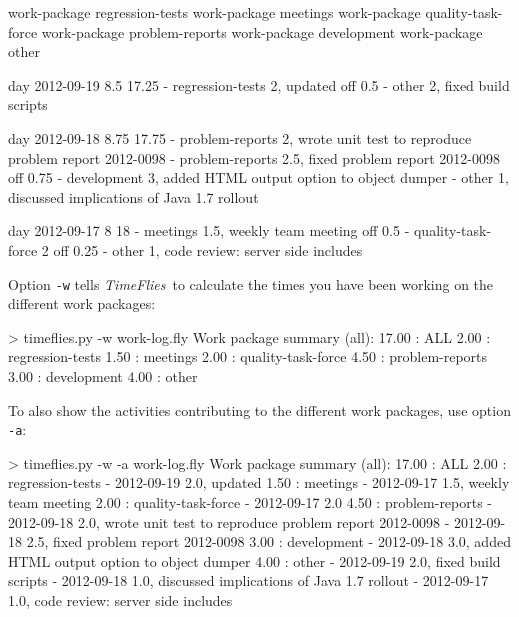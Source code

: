 \documentclass[11pt]{article}
\newcommand{\timeflies}{\emph{TimeFlies}}
\begin{document}
\begin{inputfile}
work-package regression-tests
work-package meetings
work-package quality-task-force
work-package problem-reports
work-package development
work-package other

day 2012-09-19 8.5 17.25
- regression-tests 2, updated
off 0.5
- other 2, fixed build scripts

day 2012-09-18 8.75 17.75
- problem-reports 2, wrote unit test to reproduce problem report 2012-0098
- problem-reports 2.5, fixed problem report 2012-0098
off 0.75
- development 3, added HTML output option to object dumper
- other 1, discussed implications of Java 1.7 rollout

day 2012-09-17 8 18
- meetings 1.5, weekly team meeting
off 0.5
- quality-task-force 2 
off 0.25
- other 1, code review: server side includes
\end{inputfile}

Option \verb:-w: tells \timeflies\ to calculate the times you have been working on the different work packages:

\begin{inputfile}
> timeflies.py -w work-log.fly 
Work package summary (all):
 17.00 : ALL
      2.00 : regression-tests
      1.50 : meetings
      2.00 : quality-task-force
      4.50 : problem-reports
      3.00 : development
      4.00 : other
\end{inputfile}

To also show the activities contributing to the different work packages, use option \verb:-a::

\begin{inputfile}
> timeflies.py -w -a work-log.fly 
Work package summary (all):
 17.00 : ALL
      2.00 : regression-tests
             - 2012-09-19 2.0, updated
      1.50 : meetings
             - 2012-09-17 1.5, weekly team meeting
      2.00 : quality-task-force
             - 2012-09-17 2.0
      4.50 : problem-reports
             - 2012-09-18 2.0, wrote unit test to reproduce problem report 2012-0098
             - 2012-09-18 2.5, fixed problem report 2012-0098
      3.00 : development
             - 2012-09-18 3.0, added HTML output option to object dumper
      4.00 : other
             - 2012-09-19 2.0, fixed build scripts
             - 2012-09-18 1.0, discussed implications of Java 1.7 rollout
             - 2012-09-17 1.0, code review: server side includes
\end{inputfile}


\end{document}
